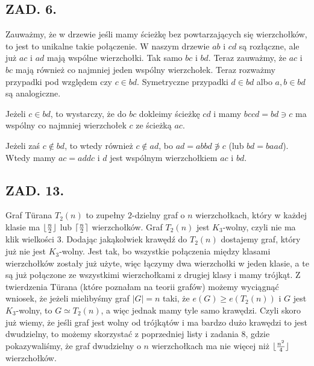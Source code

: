 \documentclass{article}
\begin{document}
\subsection*{ZAD. 6.}

Zauważmy, że w drzewie jeśli mamy ścieżkę bez powtarzających się wierzchołków, to jest to unikalne takie połączenie. W naszym drzewie $ab$ i $cd$ są rozłączne, ale już $ac$ i $ad$ mają wspólne wierzchołki. Tak samo $bc$ i $bd$. Teraz zauważmy, że $ac$ i $bc$ mają również co najmniej jeden wspólny wierzchołek. Teraz rozważmy przypadki pod względem czy $c\in bd$. Symetryczne przypadki $d\in bd$ albo $a,b\in bd$ są analogiczne.

Jeżeli $c\in bd$, to wystarczy, że do $bc$ dokleimy ścieżkę $cd$ i mamy $bccd=bd\ni c$ ma wspólny co najmniej wierzchołek $c$ ze ścieżką $ac$. 

Jeżeli zaś $c\notin bd$, to wtedy również $c\notin ad$, bo $ad=abbd\not\ni c$ (lub $bd=baad$). Wtedy mamy $ac=addc$ i $d$ jest wspólnym wierzchołkiem $ac$ i $bd$.

\subsection*{ZAD. 13.}

Graf T\"urana $T_2(n)$ to zupełny $2$-dzielny graf o $n$ wierzchołkach, który w każdej klasie ma $\lfloor {n\over 2}\rfloor$ lub $\lceil{n\over2}\rceil$ wierzchołków. Graf $T_2(n)$ jest $K_3$-wolny, czyli nie ma klik wielkości $3$. Dodając jakąkolwiek krawędź do $T_2(n)$ dostajemy graf, który już nie jest $K_3$-wolny. Jest tak, bo wszystkie połączenia między klasami wierzchołków zostały już użyte, więc łączymy dwa wierzchołki w jeden klasie, a te są już połączone ze wszystkimi wierzchołkami z drugiej klasy i mamy trójkąt. Z twierdzenia T\"urana (które poznałam na teorii grafów) możemy wyciągnąć wniosek, że jeżeli mielibyśmy graf $|G|=n$ taki, że $e(G)\geq e(T_2(n))$ i $G$ jest $K_3$-wolny, to $G\simeq T_2(n)$, a więc jednak mamy tyle samo krawędzi. Czyli skoro już wiemy, że jeśli graf jest wolny od trójkątów i ma bardzo dużo krawędzi to jest dwudzielny, to możemy skorzystać z poprzedniej listy i zadania $8$, gdzie pokazywaliśmy, że graf dwudzielny o $n$ wierzchołkach ma nie więcej niż $\lfloor{n^2\over 4}\rfloor$ wierzchołków.
\end{document}
